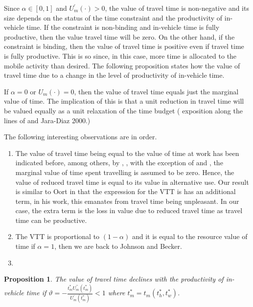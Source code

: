 \documentclass[12pt,a4paper,british]{article}
\newtheorem{prop}{Proposition}[section]
\begin{document}
Since $\alpha \in \left[0, 1 \right]$ and $U_{m}^{\prime}\left( \cdot \right) > 0$, the value of travel time is non-negative and its size depends on the status of the time constraint and the productivity of in-vehicle time. If the constraint is non-binding and in-vehicle time is fully productive, then the value travel time will be zero. On the other hand, if the constraint is binding, then the value of travel time is positive even if travel time is fully productive. This is so since, in this case, more time is allocated to the mobile activity than desired. The following proposition states how the value of travel time due to a change in the level of productivity of in-vehicle time. 

If $\alpha=0$ or $U_{m} \left( \cdot \right)=0$, then the value of travel time equals just the marginal value of time. The implication of this is that a unit reduction in travel time will be valued equally as a unit relaxation of the time budget ({\color{red} exposition along the lines of \citeauthor{Oort1969EvaluationTravellingTime} and Jara-Diaz 2000.}) 

The following interesting observations are in order.

\begin{enumerate}
\item The value of travel time being equal to the value of time at work has been indicated before, among others, by \citet{Becker1965TheoryAllocationTime}, \citet{Johnson1966TravelTimePrice}, with the exception of \citet{Oort1969EvaluationTravellingTime} and \cite{DeSerpa1971TheoryEconomicsTime}, the marginal value of time spent travelling is assumed to be zero. Hence, the value of reduced travel time is equal to its value in alternative use. Our result is similar to Oort in that the expression for the VTT is has an additional term, in his work, this emanates from travel time being unpleasant. In our case, the extra term is the loss in value due to reduced travel time as travel time can be productive. 
\item The VTT is proportional to $\left( 1 - \alpha \right)$ and it is equal to the resource value of time if  $\alpha=1$, then we are back to Johnson and Becker.
\item 
\end{enumerate}

\begin{prop}
The value of travel time declines with the productivity of in-vehicle time if $\vartheta = -\frac{t_{m}^{\ast} U_{m}^{\prime\prime} \left( t_{m}^{\ast} \right)} {U_{m}^{\prime}\left( t_{m}^{\ast} \right)}<1$ where $t_{m}^{\ast} = t_{m}\left(t_{h}^{\ast},t_{w}^{\ast}\right)$.
\end{prop}
\end{document}
